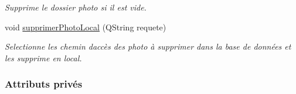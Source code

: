 \begin{DoxyCompactItemize}
\begin{DoxyCompactList}\small\item\em Supprime le dossier photo si il est vide. \end{DoxyCompactList}\item 
void \hyperlink{class_i_h_m_accueil_a9dc22241cd0d4a227b8b0bf04c6404fd}{supprimer\+Photo\+Local} (Q\+String requete)
\begin{DoxyCompactList}\small\item\em Selectionne les chemin d\textquotesingle{}accès des photo à supprimer dans la base de données et les supprime en local. \end{DoxyCompactList}\end{DoxyCompactItemize}
\subsubsection*{Attributs privés}

